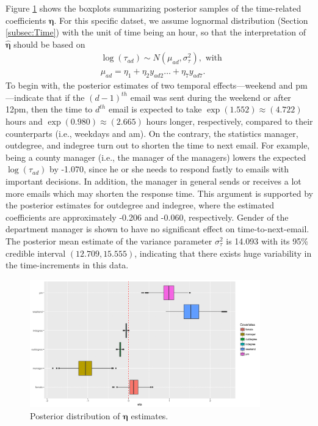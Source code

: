 \documentclass[12pt]{article}
\begin{document}
	Figure \ref{figure:etaresults} shows the boxplots summarizing posterior samples of the time-related coefficients $\boldsymbol{\eta}$. For this specific datset, we assume lognormal distribution (Section \ref{subsec:Time}) with the unit of time being an hour, so that the interpretation of $\hat{\boldsymbol{\eta}}$ should be based on
\begin{equation*}
\begin{aligned}
&\log(\tau_{ad}) \sim N(\mu_{ad}, \sigma_\tau^2), \mbox{ with }\\
&\mu_{ad} = \eta_{1}+\eta_{2} y_{ad2}\ldots+\eta_{7}y_{ad7}.
\end{aligned}
\end{equation*}
To begin with, the posterior estimates of two temporal effects---weekend and pm---indicate that if the ${(d-1)}^{th}$ email was sent during the weekend or after 12pm, then the time to $d^{th}$ email is expected to take $\exp(1.552)\approx(4.722)$ hours and $\exp(0.980)\approx(2.665)$ hours longer, respectively, compared to their counterparts (i.e., weekdays and am). On the contrary, the statistics manager, outdegree, and indegree turn out to shorten the time to next email. For example, being a county manager (i.e., the manager of the managers) lowers the expected $\log(\tau_{ad})$ by -1.070, since he or she needs to respond fastly to emails with important decisions. In addition, the manager in general sends or receives a lot more emails which may shorten the response time. This argument is supported by the posterior estimates for outdegree and indegree, where the estimated coefficients are approximately -0.206 and -0.060, respectively. Gender of the department manager is shown to have no significant effect on time-to-next-email. The posterior mean estimate of the variance parameter $\sigma^2_\tau$ is 14.093 with its 95\% credible interval $(12.709, 15.555)$, indicating that there exists huge variability in the time-increments in this data.
	\begin{figure}[!t]
		\centering
		\includegraphics[width=0.89\textwidth]{plots_paper/etaest-1.png}	
		\caption {Posterior distribution of $\boldsymbol{\eta}$ estimates.}
		\label{figure:etaresults}
	\end{figure}
\end{document}
